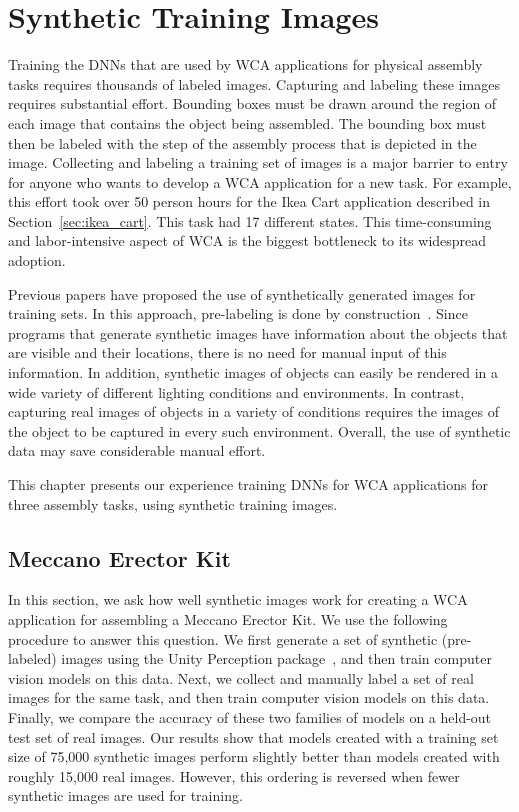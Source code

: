 \chapter{Synthetic Training Images}\label{chap:synthetic}

Training the DNNs that are used by WCA applications for physical assembly tasks
requires thousands of labeled images.
Capturing and labeling these images requires substantial effort.
Bounding boxes must be drawn around the region of each image that
contains the object being assembled.  The bounding box must then be
labeled with the step of the assembly process that is depicted in the
image.  Collecting and labeling a training set of images is a major
barrier to entry for anyone who wants to develop a WCA application for
a new task.
For example, this effort took over 50 person hours for the Ikea Cart application
described in Section~\ref{sec:ikea_cart}.
This task had 17 different states.
This time-consuming and labor-intensive
aspect of WCA is the biggest bottleneck to its widespread adoption.

Previous papers have proposed the use of synthetically generated
images for training sets.  In this approach, pre-labeling is done by
construction~\cite{synthetic_data, DBLP:journals/corr/abs-1809-10790,
  photo2, real_background1, real_background2, real_background3,
  dwibedi}.  Since programs that generate synthetic images have
information about the objects that are visible and their locations,
there is no need for manual input of this information.  In addition,
synthetic images of objects can easily be rendered in a wide variety
of different lighting conditions and environments.  In contrast,
capturing real images of objects in a variety of conditions requires
the images of the object to be captured in every such environment.
Overall, the use of synthetic data may save considerable manual
effort.

This chapter presents our experience training DNNs for WCA applications for
three assembly tasks, using synthetic training images.

\section{Meccano Erector Kit}

In this section, we ask how well synthetic images work for creating a WCA
application for assembling a Meccano Erector Kit.
We use the following procedure to answer this
question.  We first generate a set of synthetic (pre-labeled) images
using the Unity Perception package~\cite{unity}, and then train
computer vision models on this data.  Next, we  collect and manually
label a set of real images for the same task, and then train computer
vision models on this data.  Finally, we compare the accuracy of these
two families of models on a held-out test set of real images.  Our
results show that models created with a training set size of 75,000
synthetic images perform slightly better than models created with
roughly 15,000 real images.
However, this ordering is reversed when fewer synthetic images are used for
training.

